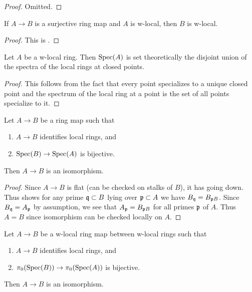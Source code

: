\begin{proof}
  Omitted.
\end{proof}

\begin{lemma}
  \label{thm:surjective-w-local-ring}
  If \(A \to B\) is a surjective ring map and \(A\) is w-local, then \(B\) is w-local.
\end{lemma}

\begin{proof}
  This is .
\end{proof}

\begin{lemma}
  \label{thm:w-local-set-decomposition}
  Let $A$ be a w-local ring. Then $\operatorname{Spec} (A)$ is set theoretically the disjoint union of the spectra of the local
  rings at closed points.
\end{lemma}

\begin{proof}
  This follows from the fact that every point specializes to a unique closed point and the spectrum of the local ring at a point is the set of all points specialize to it.
\end{proof}

\begin{lemma}
  \label{thm:isom-of-identifies-local-rings-bijective}
  Let $A \to B$ be a ring map such that
  \begin{enumerate}
    \item $A \to B$ identifies local rings, and
    \item $\operatorname{Spec} (B) \to \operatorname{Spec} (A)$ is bijective.
  \end{enumerate}
  Then $A \to B$ is an isomorphism.
\end{lemma}

\begin{proof}
    Since $A \to B$ is flat (can be checked on stalks of \(B\)), it has going down. %
    Thus  shows for any prime ${\mathfrak{q}} \subset B$ lying over ${\mathfrak{p}} \subset A$ we have $B_{{\mathfrak{q}}} = B_{{\mathfrak{p}} B}$. Since $B_{{\mathfrak{q}}} = A_{{\mathfrak{p}}}$ by assumption, we see that $A_{{\mathfrak{p}}} = B_{{\mathfrak{p}} B}$ for all primes ${\mathfrak{p}}$ of $A$. Thus $A = B$ since isomorphism can be checked locally on $A$.
\end{proof}

\begin{lemma}[\stacksproject{097E}]
  \label{thm:isom-of-identifies-local-rings-w-local-isom-pi0}
  Let $A \to B$ be a w-local ring map between w-local rings such that
  \begin{enumerate}
    \item $A \to B$ identifies local rings, and
    \item $\pi_0(\operatorname{Spec} (B)) \to \pi_0(\operatorname{Spec} (A))$ is bijective.
  \end{enumerate}
  Then $A \to B$ is an isomorphism.
\end{lemma}

